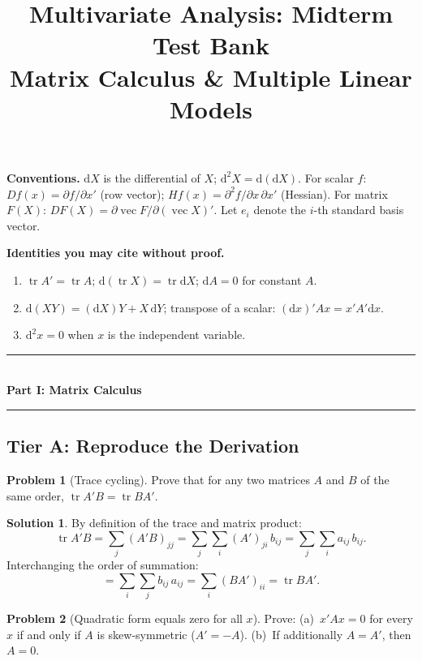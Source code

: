\documentclass[12pt,a4paper]{article}
\title{\textbf{Multivariate Analysis: Midterm Test Bank}\\[2mm]\large Matrix Calculus \& Multiple Linear Models}
\author{}
\date{}
\theoremstyle{definition}
\newtheorem{exercise}{Problem}
\newtheorem*{solution*}{Solution}
\DeclareMathOperator\tr{tr}
\DeclareMathOperator{\avec}{vec}
\newcommand{\dd}{\mathrm{d}}
\begin{document}
\maketitle

\medskip\noindent\textbf{Conventions.}\; $\dd X$ is the differential of $X$; $\dd^2 X = \dd(\dd X)$. For scalar $f$: $Df(x) = \partial f/\partial x'$ (row vector); $Hf(x) = \partial^2 f/\partial x\,\partial x'$ (Hessian). For matrix $F(X)$: $DF(X) = \partial\avec F/\partial(\avec X)'$. Let $e_i$ denote the $i$-th standard basis vector.

\medskip\noindent\textbf{Identities you may cite without proof.}
\begin{enumerate}[label=(I\arabic*),nosep]
\item $\tr A' = \tr A$; \; $\dd(\tr X) = \tr\dd X$; \; $\dd A = 0$ for constant $A$.
\item $\dd(XY) = (\dd X)Y + X\,\dd Y$; \; transpose of a scalar: $(\dd x)'Ax = x'A'\dd x$.
\item $\dd^2 x = 0$ when $x$ is the independent variable.
\end{enumerate}

\bigskip
\begin{center}
\rule{0.6\textwidth}{0.4pt}\\[2mm]
{\Large\bfseries Part I: Matrix Calculus}\\[1mm]
\rule{0.6\textwidth}{0.4pt}
\end{center}

\subsection*{Tier A: Reproduce the Derivation}

\begin{exercise}[Trace cycling]\label{mc:A1}
Prove that for any two matrices $A$ and $B$ of the same order, $\tr A'B = \tr BA'$.
\end{exercise}

\begin{solution*}
By definition of the trace and matrix product:
\[
\tr A'B = \sum_j (A'B)_{jj} = \sum_j \sum_i (A')_{ji}\, b_{ij} = \sum_j \sum_i a_{ij}\, b_{ij}.
\]
Interchanging the order of summation:
\[
= \sum_i \sum_j b_{ij}\, a_{ij} = \sum_i (BA')_{ii} = \tr BA'. \tag*{\qed}
\]
\end{solution*}

\begin{exercise}[Quadratic form equals zero for all $x$]\label{mc:A2}
Prove: (a)~$x'Ax = 0$ for every $x$ if and only if $A$ is skew-symmetric ($A' = -A$). (b)~If additionally $A = A'$, then $A = 0$.
\end{exercise}
\end{document}
